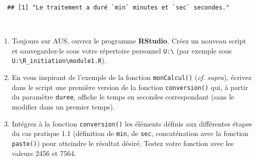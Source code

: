 \documentclass[12pt,twosided, notitlepage]{book}
\newenvironment{Shaded}{}{}
\newcommand{\KeywordTok}[1]{\textcolor[rgb]{0.00,0.00,1.00}{{#1}}}
\newcommand{\DecValTok}[1]{{#1}}
\newcommand{\StringTok}[1]{\textcolor[rgb]{0.00,0.50,0.50}{{#1}}}
\newcommand{\CommentTok}[1]{\textcolor[rgb]{0.00,0.50,0.00}{{#1}}}
\newcommand{\NormalTok}[1]{{#1}}
\newif \ifsol
\renewenvironment{Shaded}{\begin{snugshade}}{\end{snugshade}}
\begin{document}
\begin{verbatim}
  ## [1] "Le traitement a duré `min` minutes et `sec` secondes."
\end{verbatim}

~

\begin{enumerate}
\def\labelenumi{\alph{enumi}.}
\item
  Toujours sur AUS, ouvrez le programme \textbf{RStudio}. Créez un
  nouveau script et sauvegardez-le sous votre répertoire personnel
  \texttt{U:\textbackslash{}} (par exemple sous
  \texttt{U:\textbackslash{}R\_initiation\textbackslash{}module1.R}).
\item
  En vous inspirant de l'exemple de la fonction \texttt{monCalcul()}
  (\emph{cf.} \emph{supra}), écrivez dans le script une première version
  de la fonction \texttt{conversion()} qui, à partir du paramètre
  \texttt{duree}, affiche le temps en secondes correspondant (sans le
  modifier dans un premier temps).

  \ifsol 

  \begin{center} \rule{0.5\linewidth}{\linethickness}\end{center}

\begin{Shaded}
\begin{Highlighting}[]
\CommentTok{# La structure de base d'une définition de fonction est simple :}
\CommentTok{# l'opérateur d'assignation est utilisé pour associer à un nom}
\CommentTok{# le code de la fonction}
\NormalTok{conversion <-}\StringTok{ }\NormalTok{function(duree)\{}
  \KeywordTok{return}\NormalTok{(duree)}
\NormalTok{\}}
\CommentTok{# Dans cette première version, on ne fait que renvoyer la valeur}
\CommentTok{# de duree à l'identique.}
\KeywordTok{conversion}\NormalTok{(}\DecValTok{2456}\NormalTok{)}
  \NormalTok{## [1] 2456}
\end{Highlighting}
\end{Shaded}

  \begin{center} \rule{0.5\linewidth}{\linethickness}\end{center}

  \bigskip  \fi 
\item
  Intégrez à la fonction \texttt{conversion()} les éléments définis aux
  différentes étapes du cas pratique 1.1 (définition de \texttt{min}, de
  \texttt{sec}, concaténation avec la fonction \texttt{paste()}) pour
  atteindre le résultat désiré. Testez votre fonction avec les valeurs
  2456 et 7564.


\end{enumerate}
\end{document}
